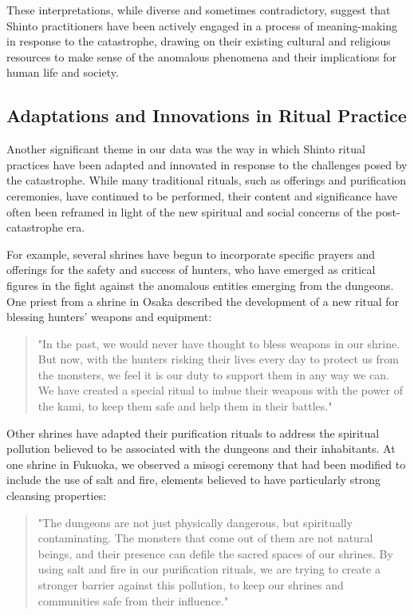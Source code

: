 \documentclass[12pt, a4paper]{article}
\begin{document}
These interpretations, while diverse and sometimes contradictory, suggest that Shinto practitioners have been actively engaged in a process of meaning-making in response to the catastrophe, drawing on their existing cultural and religious resources to make sense of the anomalous phenomena and their implications for human life and society.

\subsection{Adaptations and Innovations in Ritual Practice}
Another significant theme in our data was the way in which Shinto ritual practices have been adapted and innovated in response to the challenges posed by the catastrophe. While many traditional rituals, such as offerings and purification ceremonies, have continued to be performed, their content and significance have often been reframed in light of the new spiritual and social concerns of the post-catastrophe era.

For example, several shrines have begun to incorporate specific prayers and offerings for the safety and success of hunters, who have emerged as critical figures in the fight against the anomalous entities emerging from the dungeons. One priest from a shrine in Osaka described the development of a new ritual for blessing hunters' weapons and equipment:

\begin{quote}
"In the past, we would never have thought to bless weapons in our shrine. But now, with the hunters risking their lives every day to protect us from the monsters, we feel it is our duty to support them in any way we can. We have created a special ritual to imbue their weapons with the power of the kami, to keep them safe and help them in their battles."
\end{quote}

Other shrines have adapted their purification rituals to address the spiritual pollution believed to be associated with the dungeons and their inhabitants. At one shrine in Fukuoka, we observed a misogi ceremony that had been modified to include the use of salt and fire, elements believed to have particularly strong cleansing properties:

\begin{quote}
"The dungeons are not just physically dangerous, but spiritually contaminating. The monsters that come out of them are not natural beings, and their presence can defile the sacred spaces of our shrines. By using salt and fire in our purification rituals, we are trying to create a stronger barrier against this pollution, to keep our shrines and communities safe from their influence."
\end{quote}
\end{document}
